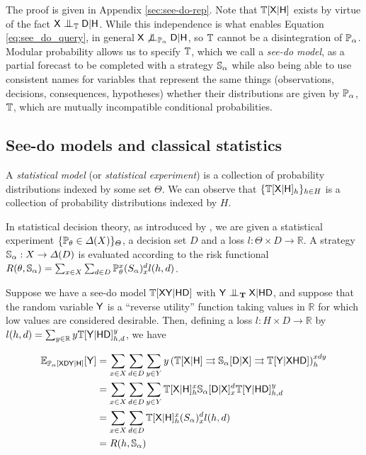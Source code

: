 The proof is given in Appendix \ref{sec:see-do-rep}. Note that $\mathbb{T}[\mathsf{X}|\mathsf{H}]$ exists by virtue of the fact $\RV{X}\CI_{\model{T}}\RV{D}|\RV{H}$. While this independence is what enables Equation \ref{eq:see_do_query}, in general $\RV{X}\not\CI_{\model{P}_\alpha} \RV{D}|\RV{H}$, so $\mathbb{T}$ cannot be a disintegration of $\mathbb{P}_\alpha$. Modular probability allows us to specify $\mathbb{T}$, which we call a \emph{see-do model}, as a partial forecast to be completed with a strategy $\mathbb{S}_\alpha$ while also being able to use consistent names for variables that represent the same things (observations, decisions, consequences, hypotheses) whether their distributions are given by $\mathbb{P}_\alpha$, $\mathbb{T}$, which are mutually incompatible conditional probabilities.

\subsection{See-do models and classical statistics}

A \emph{statistical model} (or \emph{statistical experiment}) is a collection of probability distributions indexed by some set $\Theta$. We can observe that $\{\mathbb{T}[\mathsf{X}|\mathsf{H}]_h\}_{h\in H}$ is a collection of probability distributions indexed by $H$.

In statistical decision theory, as introduced by \citet{wald_statistical_1950}, we are given a statistical experiment $\{\mathbb{P}_\theta\in \Delta(X)\}_\Theta$, a decision set $D$ and a loss $l:\Theta\times D\to \mathbb{R}$. A strategy $\mathbb{S}_\alpha:X\to \Delta(D)$ is evaluated according to the risk functional $R(\theta,\mathbb{S}_\alpha)=\sum_{x\in X}\sum_{d\in D} \mathbb{P}_\theta^x (S_\alpha)_x^d l(h,d)$.

Suppose we have a see-do model $\mathbb{T}[\mathsf{X}\mathsf{Y}|\mathsf{HD}]$ with $\RV{Y}\CI_{\kernel{T}} \RV{X}|\RV{HD}$, and suppose that the random variable $\mathsf{Y}$ is a ``reverse utility'' function taking values in $\mathbb{R}$ for which low values are considered desirable. Then, defining a loss $l:H\times D\to \mathbb{R}$ by $l(h,d) = \sum_{y\in \mathbb{R}} y\mathbb{T}[\mathsf{Y}|\mathsf{H}\mathsf{D}]_{h,d}^y$, we have 

\begin{align}
    \mathbb{E}_{\mathbb{P}_{\alpha}[\mathsf{X}\mathsf{D}\mathsf{Y}|\mathsf{H}]}[\mathsf{Y}] &= \sum_{x\in X} \sum_{d\in D} \sum_{y\in Y} y \left(\mathbb{T}[\mathsf{X}|\mathsf{H}]\rightrightarrows \mathbb{S}_\alpha [\mathsf{D}|\mathsf{X}] \rightrightarrows \mathbb{T}[\mathsf{Y}|\mathsf{XHD}]\right)_h^{xdy}\\
     &= \sum_{x\in X} \sum_{d\in D} \sum_{y\in Y} \mathbb{T}[\mathsf{X}|\mathsf{H}]^x_h \mathbb{S}_\alpha [\mathsf{D}|\mathsf{X}]_x^d \mathbb{T}[\mathsf{Y}|\mathsf{H}\mathsf{D}]_{h,d}^y\\
    &= \sum_{x\in X}\sum_{d\in D} \mathbb{T}[\mathsf{X}|\mathsf{H}]_h^x (S_\alpha)_x^d l(h,d)\\
    &= R(h,\mathbb{S}_\alpha)
\end{align}

